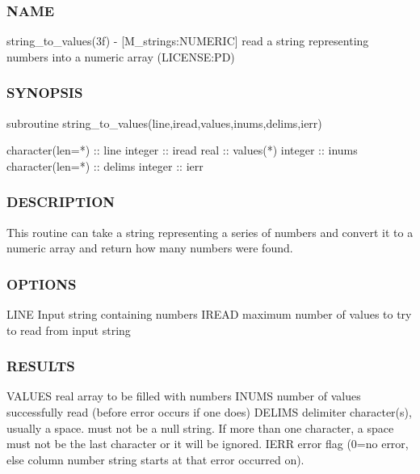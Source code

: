 \subsubsection*{N\+A\+ME}

string\+\_\+to\+\_\+values(3f) -\/ \mbox{[}M\+\_\+strings\+:N\+U\+M\+E\+R\+IC\mbox{]} read a string representing numbers into a numeric array (L\+I\+C\+E\+N\+SE\+:PD) 

\subsubsection*{S\+Y\+N\+O\+P\+S\+IS}

\begin{DoxyVerb}   subroutine string_to_values(line,iread,values,inums,delims,ierr)

    character(len=*) :: line
    integer          :: iread
    real             :: values(*)
    integer          :: inums
    character(len=*) :: delims
    integer          :: ierr
\end{DoxyVerb}
 \subsubsection*{D\+E\+S\+C\+R\+I\+P\+T\+I\+ON}

This routine can take a string representing a series of numbers and convert it to a numeric array and return how many numbers were found.

\subsubsection*{O\+P\+T\+I\+O\+NS}

\begin{DoxyVerb}   LINE     Input string containing numbers
   IREAD    maximum number of values to try to read from input string
\end{DoxyVerb}


\subsubsection*{R\+E\+S\+U\+L\+TS}

\begin{DoxyVerb}   VALUES   real array to be filled with numbers
   INUMS    number of values successfully read (before error occurs
            if one does)
   DELIMS   delimiter character(s), usually a space. must not be a
            null string. If more than one character, a space must
            not be the last character or it will be ignored.
   IERR     error flag (0=no error, else column number string starts
            at that error occurred on).
\end{DoxyVerb}


